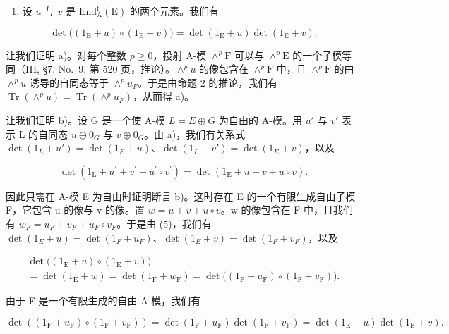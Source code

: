 \begin{enumerate}
\def\labelenumi{\alph{enumi})}
\setcounter{enumi}{1}
\tightlist
\item
  设 \(u\) 与 \(v\) 是 \(\mathrm{End}_{\mathrm{A}}^{\mathrm{f}}(\mathrm{E})\) 的两个元素。我们有
\end{enumerate}

\[
\det \bigl ((1 _ {\mathrm{E}} + u) \circ (1 _ {\mathrm{E}} + v) \bigr) = \det (1 _ {\mathrm{E}} + u) \det (1 _ {\mathrm{E}} + v).\tag{6}
\]

让我们证明 a)。对每个整数 \(p \geqslant 0\)，投射 A-模 \(\wedge^p\mathrm{F}\) 可以与 \(\wedge^p\mathrm{E}\) 的一个子模等同（III, §7, No.~9, 第 520 页，推论）。\(\wedge^p u\) 的像包含在 \(\wedge^p\mathrm{F}\) 中，且 \(\wedge^p\mathrm{F}\) 的由 \(\wedge^{p}u\) 诱导的自同态等于 \(\wedge^{p}u_{F}\)。于是由命题 2 的推论，我们有 \(\operatorname{Tr}(\wedge^{p}u)=\operatorname{Tr}(\wedge^{p}u_{F})\)，从而得 a)。

让我们证明 b)。设 G 是一个使 A-模 \(L = E \oplus G\) 为自由的 A-模。用 \(u'\) 与 \(v'\) 表示 L 的自同态 \(u \oplus 0_{G}\) 与 \(v \oplus 0_{G}\)。由 a)，我们有关系式 \(\det(1_{L} + u') = \det(1_{E} + u)\)、\(\det(1_{L} + v') = \det(1_{E} + v)\)，以及

\[
\det (1 _ {\mathrm{L}} + u ^ {\prime} + v ^ {\prime} + u ^ {\prime} \circ v ^ {\prime}) = \det (1 _ {\mathrm{E}} + u + v + u \circ v).
\]

因此只需在 A-模 E 为自由时证明断言 b)。这时存在 E 的一个有限生成自由子模 F，它包含 u 的像与 v 的像。置 \(w = u + v + u \circ v\)。w 的像包含在 F 中，且我们有 \(w_{F} = u_{F} + v_{F} + u_{F} \circ v_{F}\)。于是由 (5)，我们有 \(\det(1_{E} + u) = \det(1_{F} + u_{F})\)、\(\det(1_{E} + v) = \det(1_{F} + v_{F})\)，以及

\[
\begin{array}{c} \det \bigl ((1 _ {\mathrm{E}} + u) \circ (1 _ {\mathrm{E}} + v) \bigr) \\ = \det (1 _ {\mathrm{E}} + w) = \det (1 _ {\mathrm{F}} + w _ {\mathrm{F}}) = \det \bigl ((1 _ {\mathrm{F}} + u _ {\mathrm{F}}) \circ (1 _ {\mathrm{F}} + v _ {\mathrm{F}}) \bigr). \end{array}
\]

由于 F 是一个有限生成的自由 A-模，我们有

\[
\det \left(\left(1 _ {\mathrm{F}} + u _ {\mathrm{F}}\right) \circ \left(1 _ {\mathrm{F}} + v _ {\mathrm{F}}\right)\right) = \det \left(1 _ {\mathrm{F}} + u _ {\mathrm{F}}\right) \det \left(1 _ {\mathrm{F}} + v _ {\mathrm{F}}\right) = \det \left(1 _ {\mathrm{E}} + u\right) \det \left(1 _ {\mathrm{E}} + v\right).
\]

